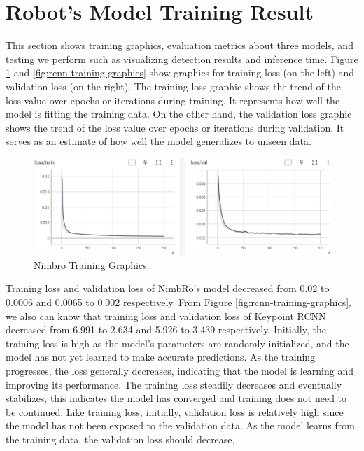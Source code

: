 \section{Robot's Model Training Result}
\label{sec:robotmodeltrainingresult}

This section shows training graphics, evaluation metrics about three models, and testing we perform such as visualizing detection results and inference time.
Figure \ref{fig:nimbro-training-graphics} and \ref{fig:rcnn-training-graphics} show graphics for training loss (on the left) and validation loss (on the right).
The training loss graphic shows the trend of the loss value over epochs or iterations during training. It represents how well the model is fitting the training data.
On the other hand, the validation loss graphic shows the trend of the loss value over epochs or iterations during validation.  It serves as an estimate of how well the model generalizes to unseen data.
\begin{figure}[ht]
  \centering
  \includegraphics[scale=0.65]{gambar/loss-nimbro.png}
  \caption{Nimbro Training Graphics.}
  \label{fig:nimbro-training-graphics}
\end{figure}
Training loss and validation loss of NimbRo's model decreased from 0.02 to 0.0006 and 0.0065 to 0.002 respectively. From Figure \ref{fig:rcnn-training-graphics},
we also can know that training loss and validation loss of Keypoint RCNN decreased from 6.991 to 2.634 and 5.926 to 3.439 respectively. Initially, the training loss is high as the model's parameters are randomly initialized,
  and the model has not yet learned to make accurate predictions. As the training progresses, the loss generally decreases, indicating that the model is learning and improving its performance.
The training loss steadily decreases and eventually stabilizes, this indicates the model has converged and training does not need to be continued.
Like training loss, initially, validation loss is relatively high since the model has not been exposed to the validation data. As the model learns from the training data, the validation loss should decrease,
